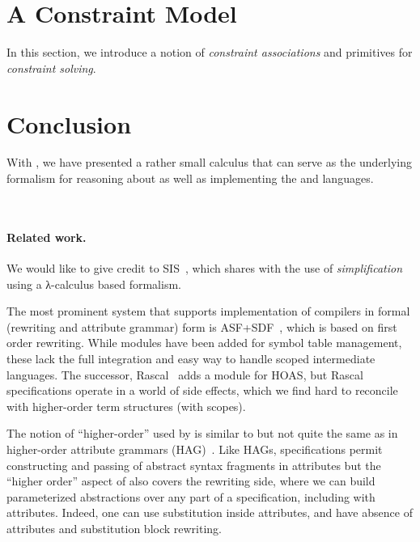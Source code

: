 \documentclass[letterpaper,11pt]{article}
\begin{document}

\section{A Constraint Model}
\label{sec:constraints}

In this section, we introduce a notion of \emph{constraint associations} and primitives for
\emph{constraint solving}.



\section{Conclusion}
\label{sec:conc}

With \hax, we have presented a rather small calculus that can serve as the underlying formalism for
reasoning about as well as implementing the \CRSX and \HAX languages.


~\cite{Knuth:mst1968} 
~\cite{Aho+:2006}


\paragraph*{Related work.}

We would like to give credit to SIS~\cite{Mosses:daimi1979}, which shares with \hax the use of
\emph{simplification} using a λ-calculus based formalism.

The most prominent system that supports implementation of compilers in formal (rewriting and
attribute grammar) form is ASF+SDF~\cite{Brand+:toplas2002}, which is based on first order
rewriting. While modules have been added for symbol table management, these lack the full
integration and easy way to handle scoped intermediate languages. The successor,
Rascal~\cite{Bos+:eptcs2011} adds a module for HOAS, but Rascal specifications operate in a world of
side effects, which we find hard to reconcile with higher-order term structures (with scopes).

The notion of ``higher-order'' used by \hax is similar to but not quite the same as in higher-order
attribute grammars (HAG)~\cite{VogtSwierstraKuiper:pldi1989}. Like HAGs, \hax specifications permit
constructing and passing of abstract syntax fragments in attributes but the ``higher order'' aspect
of \hax also covers the rewriting side, where we can build parameterized abstractions over any part
of a specification, including with attributes. Indeed, one can use substitution inside attributes,
and have absence of attributes and substitution block rewriting.
\end{document}
